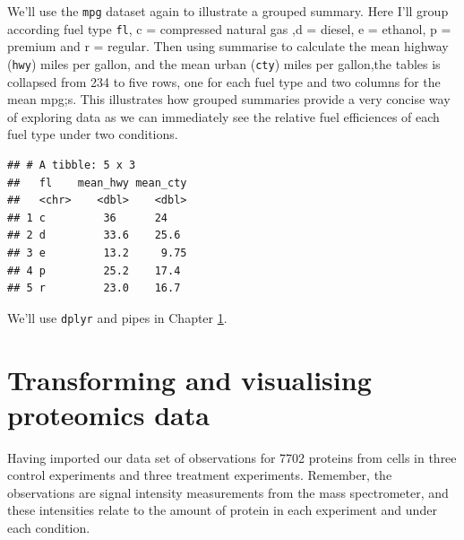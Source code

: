 \documentclass[12pt,]{book}
\newenvironment{Shaded}{\begin{snugshade}}{\end{snugshade}}
\newcommand{\CommentTok}[1]{\textcolor[rgb]{0.56,0.35,0.01}{\textit{#1}}}
\newcommand{\DataTypeTok}[1]{\textcolor[rgb]{0.13,0.29,0.53}{#1}}
\newcommand{\KeywordTok}[1]{\textcolor[rgb]{0.13,0.29,0.53}{\textbf{#1}}}
\newcommand{\NormalTok}[1]{#1}
\newcommand{\OperatorTok}[1]{\textcolor[rgb]{0.81,0.36,0.00}{\textbf{#1}}}
\newcommand{\StringTok}[1]{\textcolor[rgb]{0.31,0.60,0.02}{#1}}
\begin{document}
We'll use the \texttt{mpg} dataset again to illustrate a grouped summary. Here
I'll group according fuel type \texttt{fl}, c = compressed natural gas ,d = diesel,
e = ethanol, p = premium and r = regular.
Then using summarise to calculate the mean highway (\texttt{hwy}) miles per gallon,
and the mean urban (\texttt{cty}) miles per gallon,the tables is collapsed from 234 to
five rows, one for each fuel type and two columns for the mean mpg;s. This
illustrates how grouped summaries provide a very concise way of exploring data
as we can immediately see the relative fuel efficiences of each fuel type under
two conditions.

\begin{Shaded}
\end{Shaded}

\begin{verbatim}
## # A tibble: 5 x 3
##   fl    mean_hwy mean_cty
##   <chr>    <dbl>    <dbl>
## 1 c         36      24   
## 2 d         33.6    25.6 
## 3 e         13.2     9.75
## 4 p         25.2    17.4 
## 5 r         23.0    16.7
\end{verbatim}

We'll use \texttt{dplyr} and pipes in Chapter \ref{transform}.

\hypertarget{transform}{%
\chapter{Transforming and visualising proteomics data}\label{transform}}

Having imported our data set of observations for 7702 proteins
from cells in three control experiments and three treatment experiments.
Remember, the observations are signal intensity measurements from the mass
spectrometer, and these intensities relate to the amount of protein in each
experiment and under each condition.
\end{document}
